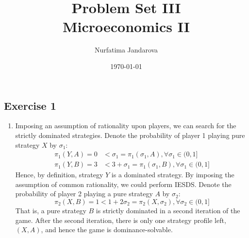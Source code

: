 \documentclass[]{article}
\title{Problem Set III \\ \large Microeconomics II}
\author{Nurfatima Jandarova}
\date{\today}
\begin{document}
\maketitle

\subsection*{Exercise 1}
\begin{enumerate}[label=(\roman*)]
	\item Imposing an assumption of rationality upon players, we can search for the strictly dominated strategies. Denote the probability of player 1 playing pure strategy $X$ by $\sigma_1$:
	\begin{equation}
		\begin{split}
		\pi_1(Y, A) = 0 &< \sigma_1 = \pi_1(\sigma_1, A),\forall\sigma_1\in(0,1]\\ \nonumber
		\pi_1(Y, B) = 3 &< 3 + \sigma_1 = \pi_1(\sigma_1, B),\forall\sigma_1\in(0,1]
		\end{split}
	\end{equation}
	Hence, by definition, strategy $Y$ is a dominated strategy. By imposing the assumption of common rationality, we could perform IESDS. Denote the probability of player 2 playing a pure strategy $A$ by $\sigma_2$:
	\begin{equation}
		\pi_2(X, B) = 1 < 1 + 2\sigma_2 = \pi_2(X, \sigma_2), \forall\sigma_2\in(0, 1]\nonumber
	\end{equation}
	That is, a pure strategy $B$ is strictly dominated in a second iteration of the game. After the second iteration, there is only one strategy profile left, $(X, A)$, and hence the game is dominance-solvable.
	

\end{enumerate}
\end{document}
